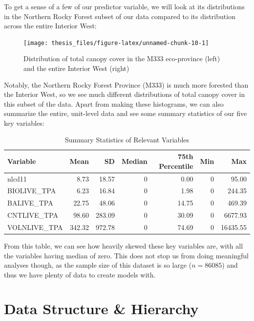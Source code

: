 \documentclass[12pt,twoside]{reedthesis}
\begin{document}
To get a sense of a few of our predictor variable, we will look at its distributions in the Northern Rocky Forest subset of our data compared to its distribution across the entire Interior West:
\begin{figure}

{\centering \texttt{[image: thesis\_files/figure-latex/unnamed-chunk-10-1]} 

}

\caption[Total canopy cover in the M333 eco-province and Interior West]{Distribution of total canopy cover in the M333 eco-province (left) and the entire Interior West (right)}\label{fig:unnamed-chunk-10}
\end{figure}
Notably, the Northern Rocky Forest Province (M333) is much more forested than the Interior West, so we see much different distributions of total canopy cover in this subset of the data. Apart from making these histograms, we can also summarize the entire, unit-level data and see some summary statistics of our five key variables:
\begin{longtable}[t]{lrrrrrr}
\caption[Summary Statistics of Relevant Variables]{\label{tab:unnamed-chunk-11}Summary Statistics of Relevant Variables}\\
\toprule
Variable & Mean & SD & Median & 75th Percentile & Min & Max\\
\midrule
nlcd11 & 8.73 & 18.57 & 0 & 0.00 & 0 & 95.00\\
BIOLIVE\_TPA & 6.23 & 16.84 & 0 & 1.98 & 0 & 244.35\\
BALIVE\_TPA & 22.75 & 48.06 & 0 & 14.75 & 0 & 469.39\\
CNTLIVE\_TPA & 98.60 & 283.09 & 0 & 30.09 & 0 & 6677.93\\
VOLNLIVE\_TPA & 342.32 & 972.78 & 0 & 74.69 & 0 & 16435.55\\
\bottomrule
\end{longtable}
From this table, we can see how heavily skewed these key variables are, with all the variables having median of zero. This does not stop us from doing meaningful analyses though, as the sample size of this dataset is so large (\(n = 86085\)) and thus we have plenty of data to create models with.

\hypertarget{data-structure-hierarchy}{%
\section{Data Structure \& Hierarchy}\label{data-structure-hierarchy}}
\end{document}
